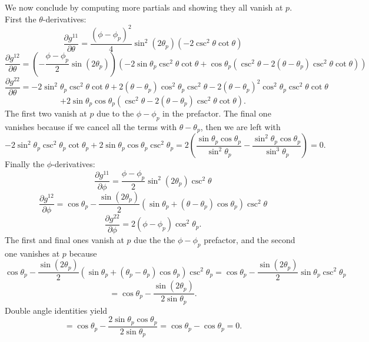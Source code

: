\documentclass[11pt, letterpaper]{article}
\begin{document}
We now conclude by computing more partials and showing they all vanish at $p$. First the $\theta $-derivatives:
\[
	\frac{\partial g^{11} }{\partial \theta } =\frac{\left( \phi -\phi _p \right) ^2}{4} \sin ^2 (2\theta _p)\left( -2\csc^2\theta \cot \theta   \right) 
\]
\[
	\frac{\partial g^{12} }{\partial \theta } =\left( -\frac{\phi -\phi _p}{2} \sin (2\theta _p) \right) \left( -2 \sin \theta _p \csc ^2\theta \cot \theta +\cos \theta _p\left( \csc ^2\theta -2(\theta -\theta _p)\csc ^2\theta \cot \theta  \right)  \right) 
\]
\[
	\frac{\partial g^{22} }{\partial \theta } =-2 \sin ^2\theta _p \csc ^2\theta \cot \theta +2(\theta -\theta _p)\cos ^2\theta _p \csc ^2\theta -2\left( \theta -\theta _p \right)^2 \cos ^2\theta _p \csc ^2\theta \cot \theta 
\]
\[
	+2 \sin \theta _p \cos \theta _p \left( \csc ^2\theta -2(\theta -\theta _p)\csc ^2\theta \cot \theta  \right) 
.\]
The first two vanish at $p$ due to the $\phi -\phi _p$ in the prefactor. The final one vanishes because if we cancel all the terms with $\theta -\theta _p$, then we are left with
\[
	-2 \sin ^2\theta _p \csc ^2\theta _p \cot \theta _p + 2 \sin \theta _p \cos \theta _p \csc ^2\theta _p = 2\left( \frac{\sin \theta _p \cos \theta _p}{\sin ^2\theta _p} - \frac{\sin ^2\theta _p \cos \theta _p}{\sin ^3\theta _p }  \right) =0
.\]
Finally the $\phi $-derivatives:
\[
	\frac{\partial g^{11} }{\partial \phi } =\frac{\phi -\phi _p}{2} \sin ^2(2\theta _p)\csc ^2\theta 
\]
\[
	\frac{\partial g^{12} }{\partial \phi } =\cos \theta _p-\frac{\sin (2\theta _p)}{2} \left( \sin \theta _p + (\theta -\theta _p)\cos \theta _p \right) \csc ^2\theta 
\]
\[
	\frac{\partial g^{22} }{\partial \phi } =2(\phi -\phi _p)\cos ^2\theta _p
.\]
The first and final ones vanish at $p$ due the the $\phi -\phi _p$ prefactor, and the second one vanishes at $p$ because
\[
	\cos \theta _p - \frac{\sin (2\theta _p)}{2}\left( \sin \theta _p + (\theta _p-\theta _p)\cos \theta _p \right) \csc ^2\theta _p = \cos \theta _p - \frac{\sin (2\theta _p)}{2} \sin \theta _p \csc ^2\theta _p
\]
\[
	=\cos \theta _p - \frac{\sin (2\theta _p)}{2 \sin \theta _p} 
.\]
Double angle identities yield
\[
	= \cos \theta _p - \frac{2 \sin \theta _p \cos \theta _p}{2 \sin \theta _p} =\cos \theta _p-\cos \theta _p = 0
.\]
\end{document}
